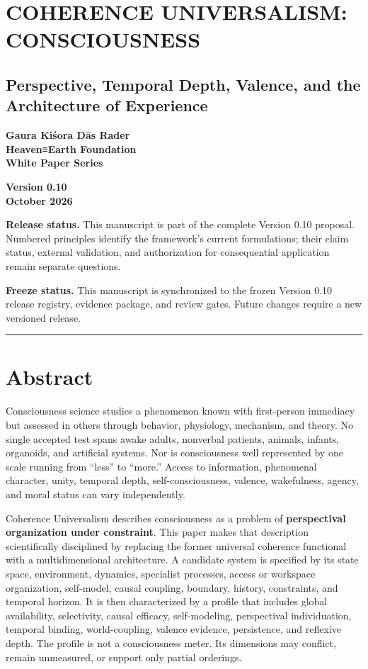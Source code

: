 \documentclass[
  11pt,
]{article}
\author{}
\date{}
\begin{document}
\section{COHERENCE UNIVERSALISM:
CONSCIOUSNESS}\label{coherence-universalism-consciousness}

\subsection{Perspective, Temporal Depth, Valence, and the Architecture
of
Experience}\label{perspective-temporal-depth-valence-and-the-architecture-of-experience}

\textbf{Gaura Kiśora Dās Rader}\\
\textbf{Heaven≡Earth Foundation}\\
\textbf{White Paper Series}

\textbf{Version 0.10}\\
\textbf{October 2026}

\textbf{Release status.} This manuscript is part of the complete Version
0.10 proposal. Numbered principles identify the framework's current
formulations; their claim status, external validation, and authorization
for consequential application remain separate questions.

\textbf{Freeze status.} This manuscript is synchronized to the frozen
Version 0.10 release registry, evidence package, and review gates.
Future changes require a new versioned release.

\begin{center}\rule{0.5\linewidth}{0.5pt}\end{center}

\section{Abstract}\label{abstract}

Consciousness science studies a phenomenon known with first-person
immediacy but assessed in others through behavior, physiology,
mechanism, and theory. No single accepted test spans awake adults,
nonverbal patients, animals, infants, organoids, and artificial systems.
Nor is consciousness well represented by one scale running from ``less''
to ``more.'' Access to information, phenomenal character, unity,
temporal depth, self-consciousness, valence, wakefulness, agency, and
moral status can vary independently.

Coherence Universalism describes consciousness as a problem of
\textbf{perspectival organization under constraint}. This paper makes
that description scientifically disciplined by replacing the former
universal coherence functional with a multidimensional architecture. A
candidate system is specified by its state space, environment, dynamics,
specialist processes, access or workspace organization, self-model,
causal coupling, boundary, history, constraints, and temporal horizon.
It is then characterized by a profile that includes global availability,
selectivity, causal efficacy, self-modeling, perspectival individuation,
temporal binding, world-coupling, valence evidence, persistence, and
reflexive depth. The profile is not a consciousness meter. Its
dimensions may conflict, remain unmeasured, or support only partial
orderings.
\end{document}
